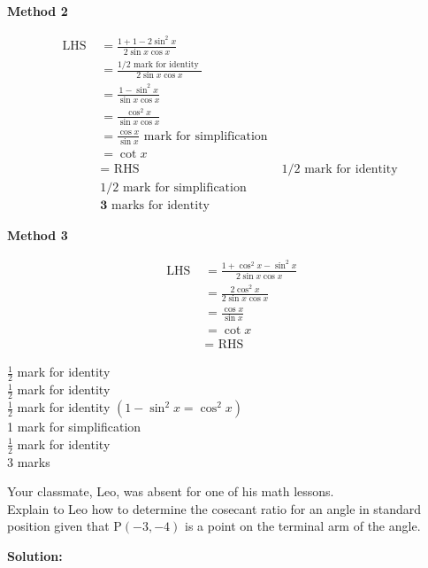 \documentclass[12pt,addpoints,answers]{exam}
\begin{document}
\begin{questions}
\begin{solution}
\textbf{Method 2}\par
$$
\begin{array}{rlr}
\text { LHS } & =\frac{1+1-2 \sin ^{2} x}{2 \sin x \cos x} & \\
& =\frac{1 / 2 \text { mark for identity }}{2 \sin x \cos x} & \\
& =\frac{1-\sin ^{2} x}{\sin x \cos x} & \\
& =\frac{\cos ^{2} x}{\sin x \cos x} & \\
& =\frac{\cos x}{\sin x} \text { mark for simplification } \\
& =\cot x & \\
& =\text { RHS } & 1 / 2 \text { mark for identity } \\
& 1 / 2 \text { mark for simplification } \\
& \mathbf{3} \text { marks for identity }
\end{array}
$$


\textbf{Method 3}\par
$$
\begin{aligned}
\text { LHS } & =\frac{1+\cos ^{2} x-\sin ^{2} x}{2 \sin x \cos x} \\
& =\frac{2 \cos ^{2} x}{2 \sin x \cos x} \\
& =\frac{\cos x}{\sin x} \\
& =\cot x \\
& =\text { RHS }
\end{aligned}
$$

$\frac{1}{2}$ mark for identity\\
$\frac{1}{2}$ mark for identity\\
$\frac{1}{2}$ mark for identity $\left(1-\sin ^{2} x=\cos ^{2} x\right)$\\
1 mark for simplification\\
$\frac{1}{2}$ mark for identity\\
3 marks
\end{solution}

\question
\leavevmode
Your classmate, Leo, was absent for one of his math lessons.\\
Explain to Leo how to determine the cosecant ratio for an angle in standard position given that $\mathrm{P}(-3,-4)$ is a point on the terminal arm of the angle.
\begin{solution}
\textbf{Solution:}\par


\end{solution}
\end{questions}
\end{document}

